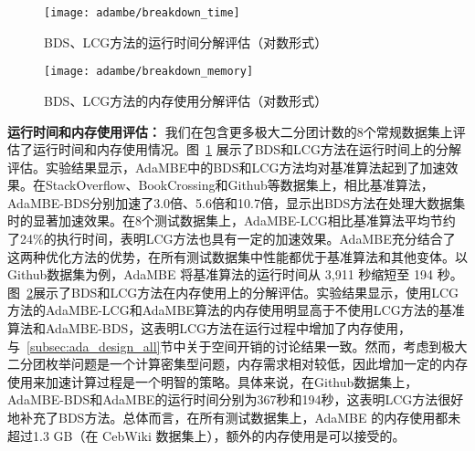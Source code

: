



\begin{figure} [H]
	\centering
	\texttt{[image: adambe/breakdown\_time]}
	\caption{BDS、LCG方法的运行时间分解评估（对数形式）}

	\label{fig:ada_breakdown_time}
\end{figure}

\begin{figure} [H]
	\centering
	\texttt{[image: adambe/breakdown\_memory]}
	\vspace{-0.1in}
	\caption{BDS、LCG方法的内存使用分解评估（对数形式）}

	\label{fig:ada_breakdown_memory}
\end{figure}


\textbf{运行时间和内存使用评估：} 我们在包含更多极大二分团计数的8个常规数据集上评估了运行时间和内存使用情况。图~\ref{fig:ada_breakdown_time} 展示了BDS和LCG方法在运行时间上的分解评估。实验结果显示，AdaMBE中的BDS和LCG方法均对基准算法起到了加速效果。在StackOverflow、BookCrossing和Github等数据集上，相比基准算法，AdaMBE-BDS分别加速了3.0倍、5.6倍和10.7倍，显示出BDS方法在处理大数据集时的显著加速效果。在8个测试数据集上，AdaMBE-LCG相比基准算法平均节约了24\%的执行时间，表明LCG方法也具有一定的加速效果。AdaMBE充分结合了这两种优化方法的优势，在所有测试数据集中性能都优于基准算法和其他变体。以Github数据集为例，AdaMBE 将基准算法的运行时间从 3,911 秒缩短至 194 秒。图~\ref{fig:ada_breakdown_memory}展示了BDS和LCG方法在内存使用上的分解评估。实验结果显示，使用LCG方法的AdaMBE-LCG和AdaMBE算法的内存使用明显高于不使用LCG方法的基准算法和AdaMBE-BDS，这表明LCG方法在运行过程中增加了内存使用，与~\ref{subsec:ada_design_all}节中关于空间开销的讨论结果一致。然而，考虑到极大二分团枚举问题是一个计算密集型问题，内存需求相对较低，因此增加一定的内存使用来加速计算过程是一个明智的策略。具体来说，在Github数据集上，AdaMBE-BDS和AdaMBE的运行时间分别为367秒和194秒，这表明LCG方法很好地补充了BDS方法。总体而言，在所有测试数据集上，AdaMBE 的内存使用都未超过1.3 GB（在 CebWiki 数据集上），额外的内存使用是可以接受的。



